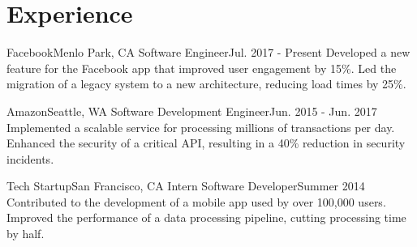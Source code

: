 \section{Experience}
  \resumeSubHeadingListStart

    \resumeSubheading
      {Facebook}{Menlo Park, CA}
      {Software Engineer}{Jul. 2017 - Present}
      \resumeItemListStart
          {Developed a new feature for the Facebook app that improved user engagement by 15\%.}
          {Led the migration of a legacy system to a new architecture, reducing load times by 25\%.}
      \resumeItemListEnd

    \resumeSubheading
      {Amazon}{Seattle, WA}
      {Software Development Engineer}{Jun. 2015 - Jun. 2017}
      \resumeItemListStart
          {Implemented a scalable service for processing millions of transactions per day.}
          {Enhanced the security of a critical API, resulting in a 40\% reduction in security incidents.}
      \resumeItemListEnd

    \resumeSubheading
      {Tech Startup}{San Francisco, CA}
      {Intern Software Developer}{Summer 2014}
      \resumeItemListStart
          {Contributed to the development of a mobile app used by over 100,000 users.}
          {Improved the performance of a data processing pipeline, cutting processing time by half.}
      \resumeItemListEnd

  \resumeSubHeadingListEnd